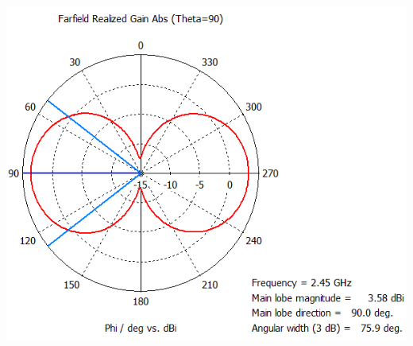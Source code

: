 \documentclass[aspectratio=43]{beamer}
\begin{document}
\begin{frame}
\begin{columns}
				\includegraphics[width=\textwidth]{bifa_broadband_pattern_theta90.png}
		\end{columns}
\end{frame}
\end{document}
